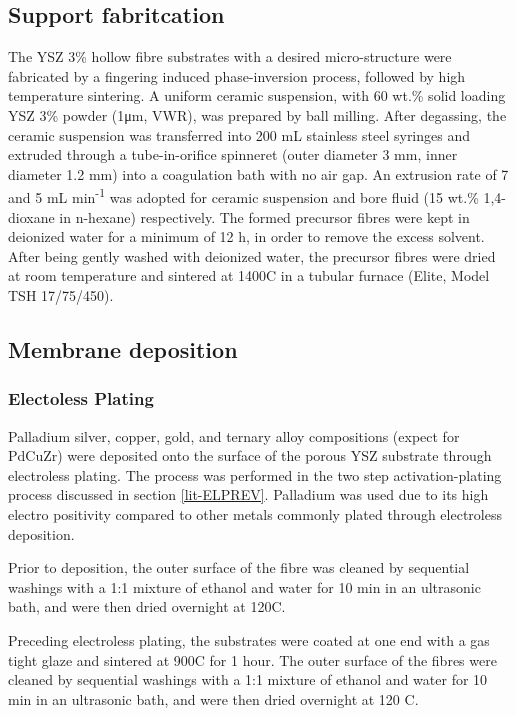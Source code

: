 \subsection{Support fabritcation}
The YSZ 3\% hollow fibre substrates with a desired micro-structure were fabricated by a fingering induced phase-inversion process, followed by high temperature sintering. A uniform ceramic suspension, with 60 wt.\% solid loading YSZ 3\% powder (1μm, VWR), was prepared by ball milling. After degassing, the ceramic suspension was transferred into 200 mL stainless steel syringes and extruded through a tube-in-orifice spinneret (outer diameter 3 mm, inner diameter 1.2 mm) into a coagulation bath with no air gap. An extrusion rate of 7 and 5 mL min\textsuperscript{-1} was adopted for ceramic suspension and bore fluid (15 wt.\% 1,4- dioxane in n-hexane) respectively. The formed precursor fibres were kept in deionized water for a minimum of 12 h, in order to remove the excess solvent. After being gently washed with deionized water, the precursor fibres were dried at room temperature and sintered at 1400\textdegree C in a tubular furnace (Elite, Model TSH 17/75/450).

\subsection{Membrane deposition}
\subsubsection{Electoless Plating}
Palladium silver, copper, gold, and ternary alloy compositions (expect for PdCuZr) were deposited onto the surface of the porous YSZ substrate through electroless plating. The process was performed in the two step activation-plating process discussed in section \ref{lit-ELPREV}. Palladium was used due to its high electro positivity compared to other metals commonly plated through electroless deposition. 

Prior to deposition, the outer surface of the fibre was cleaned by sequential washings with a 1:1 mixture of ethanol and water for 10 min in an ultrasonic bath, and were then dried overnight at 120\textdegree C.

Preceding electroless plating, the substrates were coated at one end with a gas tight glaze and sintered at 900\textdegree C for 1 hour. The outer surface of the fibres were cleaned by sequential washings with a 1:1 mixture of ethanol and water for 10 min in an ultrasonic bath, and were then dried overnight at 120 \textdegree C.


